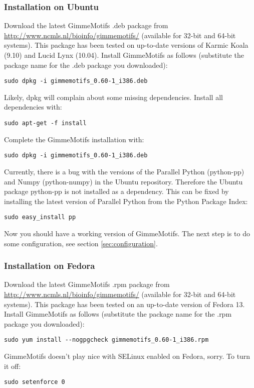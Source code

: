 \documentclass[10pt]{article}
\begin{document}
\subsubsection{Installation on Ubuntu}
Download the latest GimmeMotifs .deb package from \url{http://www.ncmls.nl/bioinfo/gimmemotifs/} (available for 32-bit and 64-bit systems). This package has been tested on up-to-date versions of Karmic Koala (9.10) and Lucid Lynx (10.04). Install GimmeMotifs as follows (substitute the package name for the .deb package you downloaded):
\begin{verbatim}
sudo dpkg -i gimmemotifs_0.60-1_i386.deb 
\end{verbatim}
Likely, dpkg will complain about some missing dependencies. Install all dependencies with:
\begin{verbatim}
sudo apt-get -f install
\end{verbatim}
Complete the GimmeMotifs installation with:
\begin{verbatim}
sudo dpkg -i gimmemotifs_0.60-1_i386.deb 
\end{verbatim}
Currently, there is a bug with the versions of the Parallel Python (python-pp) and Numpy (python-numpy) in the Ubuntu repository. Therefore the Ubuntu package python-pp is not installed as a dependency. This can be fixed by installing the latest version of Parallel Python from the Python Package Index:
\begin{verbatim}
sudo easy_install pp 
\end{verbatim}
Now you should have a working version of GimmeMotifs. The next step is to do some configuration, see section \ref{sec:configuration}.

\subsubsection{Installation on Fedora}
Download the latest GimmeMotifs .rpm package from \url{http://www.ncmls.nl/bioinfo/gimmemotifs/} (available for 32-bit and 64-bit systems). This package has been tested on an up-to-date version of Fedora 13. Install GimmeMotifs as follows (substitute the package name for the .rpm package you downloaded):
\begin{verbatim}
sudo yum install --nogpgcheck gimmemotifs_0.60-1_i386.rpm 
\end{verbatim}
GimmeMotifs doesn't play nice with SELinux enabled on Fedora, sorry. To turn it off:
\begin{verbatim}
sudo setenforce 0
\end{verbatim}
\end{document}
